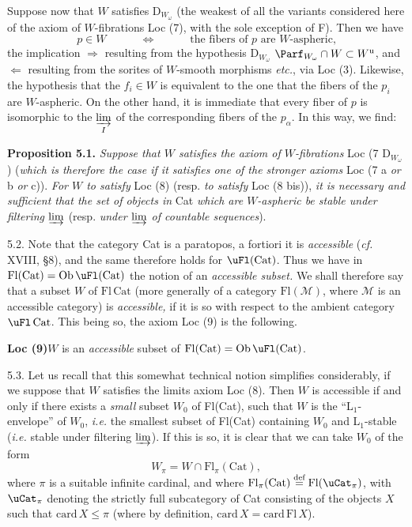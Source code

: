 Suppose now that $W$ satisfies $\mathrm{D}_{W_\omega}$ (the weakest of all the variants considered here of the axiom of $W$-fibrations Loc (7), with the sole exception of F). Then we have
\[
p \in W \qquad\quad \Longleftrightarrow \qquad\quad \text{the fibers of $p$ are $W$-aspheric,}
\]
the implication $\Longrightarrow$ resulting from the hypothesis $\mathrm{D}_{W_\omega}$ $\Parf_{W_\omega} \cap W \subset W^{\mathrm{u}}$, and $\Longleftarrow$ resulting from the sorites of $W$-smooth morphisms \textit{etc.}, via Loc (3). Likewise, the hypothesis that the $f_i \in W$ is equivalent to the one that the fibers of the $p_i$ are $W$-aspheric. On the other hand, it is immediate that
every fiber of $p$ is isomorphic to the $\varinjlim\limits_{I}$ of the corresponding fibers of the $p_\alpha$. In this way, we find:

\textbf{Proposition 5.1.} \textit{Suppose that $W$ satisfies the axiom of $W$-fibrations} Loc (7 $\mathrm{D}_{W_\omega}$) (\textit{which is therefore the case if it satisfies one of the stronger axioms} Loc (7 a \textit{or} b \textit{or} c)). \textit{For $W$ to satisfy} Loc (8) (resp. \textit{to satisfy} Loc (8 bis)), \textit{it is necessary and sufficient that the set of objects in} Cat \textit{which are $W$-aspheric be stable under filtering $\varinjlim$} (resp. \textit{under $\varinjlim$ of countable sequences}).

5.2. Note that the category Cat is a paratopos, a fortiori it is \textit{accessible} (\textit{cf.} XVIII, §8), and the same therefore holds for $\uFl(\mathrm{Cat})$. Thus we have in $\mathrm{Fl}(\mathrm{Cat}) = \mathrm{Ob}\,\uFl(\mathrm{Cat})$ the notion of an \textit{accessible subset.} We shall therefore say that a subset $W$ of $\mathrm{Fl}\,\mathrm{Cat}$ (more generally of a category $\mathrm{Fl}(\mathcal{M})$, where $\mathcal{M}$ is an accessible category) is \textit{accessible,} if it is so with respect to the ambient category
$\uFl\,\mathrm{Cat}$. This being so, the axiom Loc (9) is the following.

\textbf{Loc (9)}\quad $W$ is an \textit{accessible} subset of $\mathrm{Fl}(\mathrm{Cat}) = \mathrm{Ob}\,\uFl(\mathrm{Cat})$.

5.3. Let us recall that this somewhat technical notion simplifies considerably, if we suppose that $W$ satisfies the limits axiom Loc (8). Then $W$ is accessible if and only if there exists a \textit{small} subset $W_0$ of Fl(Cat), such that $W$ is the ``L$_1$-envelope'' of $W_0$, \textit{i.e.} the smallest subset of Fl(Cat) containing $W_0$ and L$_1$-stable (\textit{i.e.} stable under filtering $\varinjlim$). If this is so, it is clear that we can take $W_0$ of the form
\[
W_\pi = W \cap \mathrm{Fl}_\pi(\mathrm{Cat}),
\]
where $\pi$ is a suitable infinite cardinal, and where $\mathrm{Fl}_\pi(\mathrm{Cat}) \overset{\text{def}}{=} \mathrm{Fl}(\uCat_\pi)$, with $\uCat_\pi$ denoting the strictly full subcategory of Cat consisting of the objects $X$ such that $\mathrm{card}\,X \leq \pi$ (where by definition, $\mathrm{card}\,X = \mathrm{card}\,\mathrm{Fl}\,X$).

